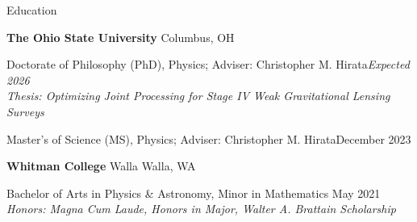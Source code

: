 \documentclass{resume} %
\begin{document}

\begin{rSection}{Education}
\vspace{.3em}
    
{\bf The Ohio State University} \hfill {Columbus, OH} 
\vspace{.3em}
\begin{rSubsection}{}{}{}{}
\item Doctorate of Philosophy (PhD), Physics; Adviser: Christopher M. Hirata\hfill{\textit{Expected 2026}} 
\\
\small{\textit{Thesis: Optimizing Joint Processing for Stage IV Weak Gravitational Lensing Surveys}} 
\vspace{.3em}
\item Master's of Science (MS), Physics; Adviser: Christopher M. Hirata\hfill{December 2023}
\end{rSubsection}

\vspace{.3em}

{\bf Whitman College} \hfill {Walla Walla, WA} 
\begin{rSubsection}{}{}{}{}

\item Bachelor of Arts in Physics \& Astronomy, Minor in Mathematics \hfill {May 2021}
\\ \small{\textit{Honors: Magna Cum Laude, Honors in Major, Walter A. Brattain Scholarship}}
\end{rSubsection}

\end{rSection}
\vspace{.2em}
\end{document}
